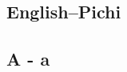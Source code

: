 \begin{multicols}{2}

\end{multicols}
\begin{multicols}{2}

\section{English–Pichi}
\end{multicols}
\subsection*{{A  -  a}}
\begin{multicols}{2}
\begin{styleFinderlistParagraph}
 \textstylefstandard{;}
\end{styleFinderlistParagraph}

\begin{styleFinderlistParagraph}
  
\end{styleFinderlistParagraph}

\begin{styleFinderlistParagraph}
 
\end{styleFinderlistParagraph}

\begin{styleFinderlistParagraph}
 
\end{styleFinderlistParagraph}

\begin{styleFinderlistParagraph}
 \textstylefstandard{,}\textstylefvernacular{} 
\end{styleFinderlistParagraph}

\begin{styleFinderlistParagraph}
 
\end{styleFinderlistParagraph}

\begin{styleFinderlistParagraph}
 
\end{styleFinderlistParagraph}


\end{multicols}
